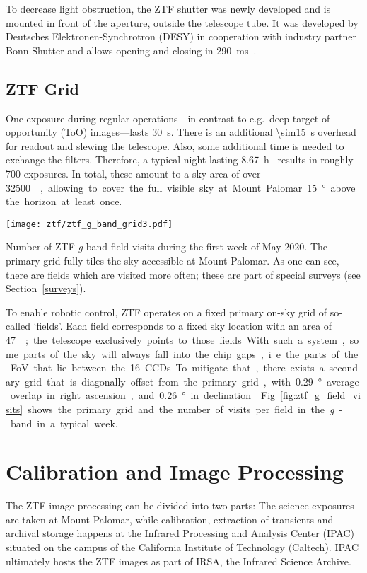 To decrease light obstruction, the ZTF shutter was newly developed and is mounted in front of the aperture, outside the telescope tube. It was developed by Deutsches Elektronen-Synchrotron (DESY) in cooperation with industry partner Bonn-Shutter and allows opening and closing in \SI{290}{\milli\second}~\cite{Dekany2020}.

\subsection{ZTF Grid}\label{ztf_grid}
One exposure during regular operations---in contrast to e.g.\ deep target of opportunity (ToO) images---lasts \SI{30}{\second}. There is an additional \SI{\sim15}{\second} overhead for readout and slewing the telescope. Also, some additional time is needed to exchange the filters. Therefore, a typical night lasting \SI{8.67}{\hour}~ results in roughly 700 exposures. In total, these amount to a sky area of over \SI{32500}{\square\deg}, allowing to cover the full visible sky at Mount Palomar \SI{15}{\degree} above the horizon at least once.

\begin{marginfigure}
    \texttt{[image: ztf/ztf\_g\_band\_grid3.pdf]}
    \caption[ZTF field visits]{Number of ZTF \textit{g}-band field visits during the first week of May 2020. The primary grid fully tiles the sky accessible at Mount Palomar. As one can see, there are fields which are visited more often; these are part of special surveys (see Section~\ref{surveys}).}
\end{marginfigure}

To enable robotic control, ZTF operates on a fixed primary on-sky grid of so-called `fields'. Each field corresponds to a fixed sky location with an area of \SI{47}{\square\deg}; the telescope exclusively points to those fields. With such a system, some parts of the sky will always fall into the chip gaps, i.e. the parts of the FoV that lie between the 16 CCDs. To mitigate that, there exists a secondary grid that is diagonally offset from the primary grid, with \SI{0.29}{\degree} average overlap in right ascension, and \SI{0.26}{\degree} in declination~. Fig.~\ref{fig:ztf_g_field_visits} shows the primary grid and the number of visits per field in the \textit{g}-band in a typical week.

\section{Calibration and Image Processing}
The ZTF image processing can be divided into two parts: The science exposures are taken at Mount Palomar, while calibration, extraction of transients and archival storage happens at the Infrared Processing and Analysis Center (IPAC) situated on the campus of the California Institute of Technology (Caltech). IPAC ultimately hosts the ZTF images as part of IRSA, the Infrared Science Archive.


